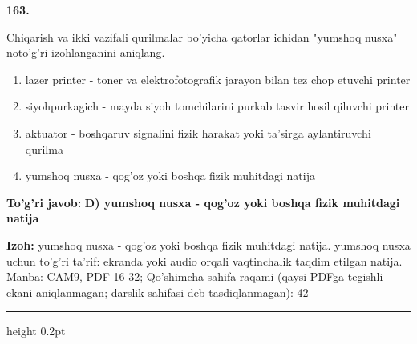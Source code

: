 \documentclass[10pt,a4paper]{article}
\begin{document}
{\bfseries\sffamily\color{ink} 163.}
\par
Chiqarish va ikki vazifali qurilmalar bo'yicha qatorlar ichidan "yumshoq nusxa" noto'g'ri izohlanganini aniqlang.
\begin{enumerate}[label=\Alph*),leftmargin=9mm]
\item lazer printer - toner va elektrofotografik jarayon bilan tez chop etuvchi printer
\item siyohpurkagich - mayda siyoh tomchilarini purkab tasvir hosil qiluvchi printer
\item aktuator - boshqaruv signalini fizik harakat yoki ta'sirga aylantiruvchi qurilma
\item yumshoq nusxa - qog'oz yoki boshqa fizik muhitdagi natija
\end{enumerate}
\begin{tcolorbox}[enhanced,breakable,colback=teal!4,colframe=teal!60!black,boxrule=0.45pt,arc=1.2mm,left=2.7mm,right=2.7mm,top=1.8mm,bottom=1.8mm,before skip=2mm,after skip=2mm]
{\bfseries\sffamily\color{teal}To'g'ri javob:} \textbf{D) yumshoq nusxa - qog'oz yoki boshqa fizik muhitdagi natija}
\par\smallskip
{\bfseries Izoh:} yumshoq nusxa - qog'oz yoki boshqa fizik muhitdagi natija. yumshoq nusxa uchun to'g'ri ta'rif: ekranda yoki audio orqali vaqtinchalik taqdim etilgan natija. Manba: CAM9, PDF 16-32; Qo'shimcha sahifa raqami (qaysi PDFga tegishli ekani aniqlanmagan; darslik sahifasi deb tasdiqlanmagan): 42
\end{tcolorbox}
\vspace{2mm}\hrule height 0.2pt\vspace{3mm}
\end{document}
